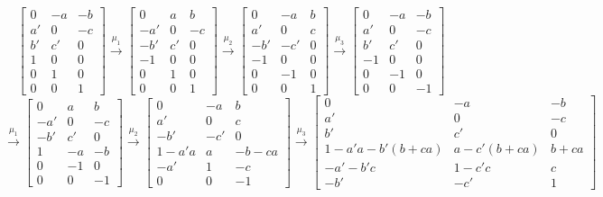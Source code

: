 \documentclass{amsart}
\numberwithin{theorem}{section}
\begin{document}
  \[
    \left[\begin{array}{ccc} 0 & -a & -b\\ a' & 0 & -c\\ b' & c' & 0\\ 1 & 0 & 0\\ 0 & 1 & 0\\ 0 & 0 & 1\end{array}\right]
    \stackrel{\mu_1}{\longrightarrow}\left[\begin{array}{ccc} 0 & a & b\\ -a' & 0 & -c\\ -b' & c' & 0\\ -1 & 0 & 0\\ 0 & 1 & 0\\ 0 & 0 & 1\end{array}\right]
    \stackrel{\mu_2}{\longrightarrow}\left[\begin{array}{ccc} 0 & -a & b\\ a' & 0 & c\\ -b' & -c' & 0\\ -1 & 0 & 0\\ 0 & -1 & 0\\ 0 & 0 & 1\end{array}\right]
    \stackrel{\mu_3}{\longrightarrow}\left[\begin{array}{ccc} 0 & -a & -b\\ a' & 0 & -c\\ b' & c' & 0\\ -1 & 0 & 0\\ 0 & -1 & 0\\ 0 & 0 & -1\end{array}\right]
  \]
  \[
    \stackrel{\mu_1}{\longrightarrow}\left[\begin{array}{ccc} 0 & a & b\\ -a' & 0 & -c\\ -b' & c' & 0\\ 1 & -a & -b\\ 0 & -1 & 0\\ 0 & 0 & -1\end{array}\right]
    \stackrel{\mu_2}{\longrightarrow}\left[\begin{array}{ccc} 0 & -a & b\\ a' & 0 & c\\ -b' & -c' & 0\\ 1-a'a & a & -b-ca\\ -a' & 1 & -c\\ 0 & 0 & -1\end{array}\right]
    \stackrel{\mu_3}{\longrightarrow}\left[\begin{array}{ccc} 0 & -a & -b\\ a' & 0 & -c\\ b' & c' & 0\\ 1-a'a-b'(b+ca) & a-c'(b+ca) & b+ca\\ -a'-b'c & 1-c'c & c\\ -b' & -c' & 1\end{array}\right]
  \]
\end{document}
